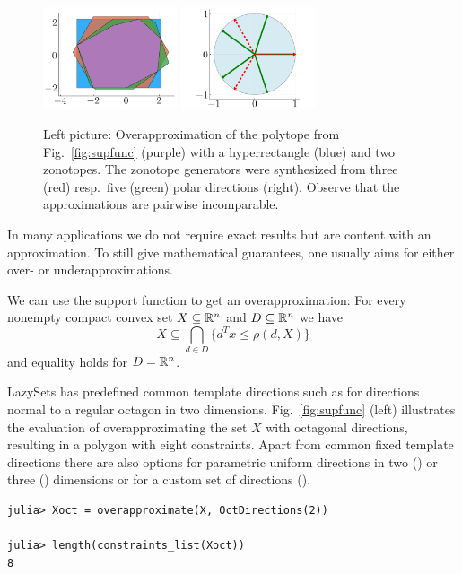 \begin{figure}
	\hfill
	\includegraphics[height=30mm]{img/overapproximate}
	\hfill
	\includegraphics[height=30mm]{img/polardirs}
	\hfill\
	\vspace*{1mm}
	\caption{Left picture: Overapproximation of the polytope from Fig.~\ref{fig:supfunc} (purple) with a hyperrectangle (blue) and two zonotopes. The zonotope generators were synthesized from three (red) resp.\ five (green) polar directions (right). Observe that the approximations are pairwise incomparable.}
	\label{fig:overapproximate}
\end{figure}

In many applications we do not require exact results but are content with an approximation. To still give mathematical guarantees, one usually aims for either over- or underapproximations.

We can use the support function to get an overapproximation: For every nonempty compact convex set $X \subseteq \mathbb{R}^n$ and $D \subseteq \mathbb{R}^n$ we have
\begin{equation*}
	X \subseteq \bigcap_{d \in D} \{d^T x \leq \rho(d, X)\}
\end{equation*}
and equality holds for $D = \mathbb{R}^n$.

LazySets has predefined common template directions such as  for directions normal to a regular octagon in two dimensions. Fig.~\ref{fig:supfunc} (left) illustrates the evaluation of overapproximating the set $X$ with octagonal directions, resulting in a polygon with eight constraints. Apart from common fixed template directions there are also options for parametric uniform directions in two () or three () dimensions or for a custom set of directions ().

\begin{minipage}{\linewidth}
\begin{lstlisting}
julia> Xoct = overapproximate(X, OctDirections(2))

julia> length(constraints_list(Xoct))
8
\end{lstlisting}
\end{minipage}

